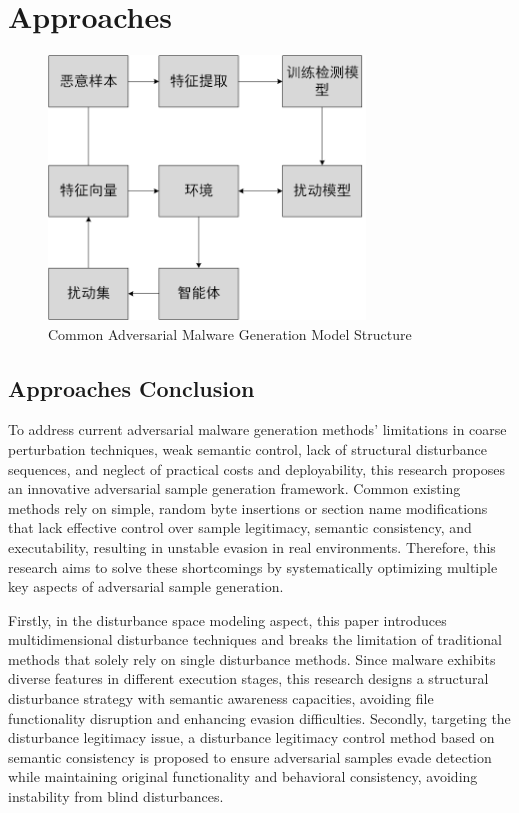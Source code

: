 \chapter{Approaches}

\begin{figure}[hbt]
	\centering
	\includegraphics[width=0.75\textwidth]{figures/3.1}
	\caption{Common Adversarial Malware Generation Model Structure}\label{fig:3.1}
\end{figure}


\section{Approaches Conclusion}
To address current adversarial malware generation methods' limitations in coarse perturbation techniques, weak semantic control, lack of structural disturbance sequences, and neglect of practical costs and deployability, this research proposes an innovative adversarial sample generation framework. Common existing methods rely on simple, random byte insertions or section name modifications that lack effective control over sample legitimacy, semantic consistency, and executability, resulting in unstable evasion in real environments. Therefore, this research aims to solve these shortcomings by systematically optimizing multiple key aspects of adversarial sample generation.

Firstly, in the disturbance space modeling aspect, this paper introduces multidimensional disturbance techniques and breaks the limitation of traditional methods that solely rely on single disturbance methods. Since malware exhibits diverse features in different execution stages, this research designs a structural disturbance strategy with semantic awareness capacities, avoiding file functionality disruption and enhancing evasion difficulties. Secondly, targeting the disturbance legitimacy issue, a disturbance legitimacy control method based on semantic consistency is proposed to ensure adversarial samples evade detection while maintaining original functionality and behavioral consistency, avoiding instability from blind disturbances.

